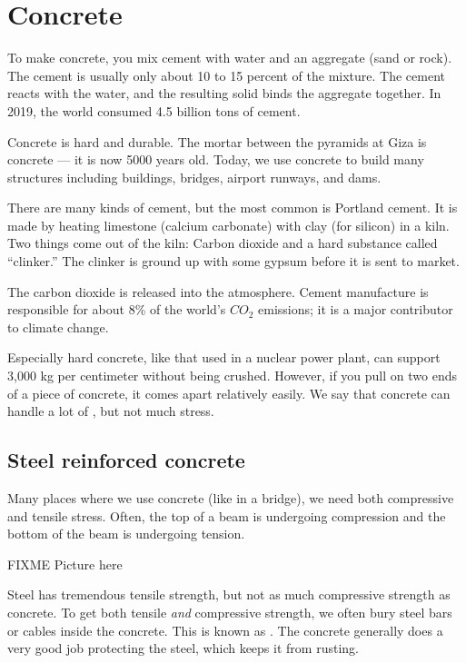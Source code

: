 \chapter{Concrete}

To make concrete, you mix cement with water and an aggregate (sand or
rock).  The cement is usually only about 10 to 15 percent of the
mixture. The cement reacts with the water, and the resulting solid
binds the aggregate together. In 2019, the world consumed 4.5 billion
tons of cement. 

Concrete is hard and durable. The mortar between the pyramids at Giza
is concrete --- it is now 5000 years old. Today, we use concrete to
build many structures including buildings, bridges, airport runways,
and dams.

There are many kinds of cement, but the most common is Portland
cement. It is made by heating limestone (calcium carbonate) with clay
(for silicon) in a kiln. Two things come out of the kiln: Carbon
dioxide and a hard substance called ``clinker.''  The clinker is
ground up with some gypsum before it is sent to market.

The carbon dioxide is released into the atmosphere. Cement manufacture
is responsible for about 8\% of the world's $CO_2$ emissions; it is a
major contributor to climate change.

Especially hard concrete, like that used in a nuclear power plant, can
support 3,000 kg per centimeter without being crushed. However, if
you pull on two ends of a piece of concrete, it comes apart relatively
easily. We say that concrete can handle a lot of , but not much  stress.

\section{Steel reinforced concrete}

Many places where we use concrete (like in a bridge), we need both
compressive and tensile stress. Often, the top of a beam is undergoing
compression and the bottom of the beam is undergoing tension.

FIXME Picture here

Steel has tremendous tensile strength, but not as much compressive
strength as concrete. To get both tensile \emph{and} compressive
strength, we often bury steel bars or cables inside the concrete.
This is known as . The concrete
generally does a very good job protecting the steel, which keeps it
from rusting.

